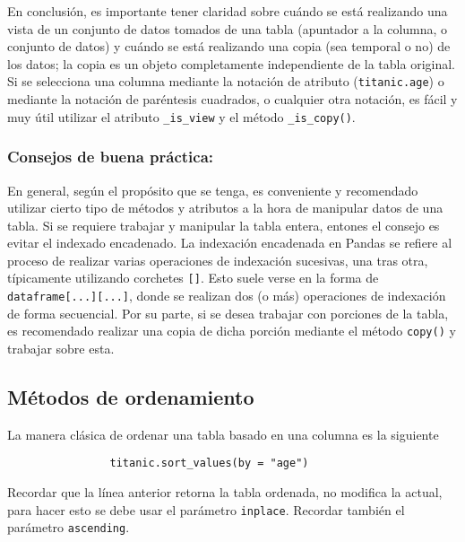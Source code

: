             \noindent En conclusión, es importante tener claridad sobre cuándo se está realizando una vista de un conjunto de datos tomados de una tabla (apuntador a la columna, o conjunto de datos) y cuándo se está realizando una copia (sea temporal o no) de los datos; la copia es un objeto completamente independiente de la tabla original. Si se selecciona una columna mediante la notación de atributo (\texttt{titanic.age}) o mediante la notación de paréntesis cuadrados, o cualquier otra notación, es fácil y muy útil utilizar el atributo \texttt{\_is\_view} y el método \texttt{\_is\_copy()}.

            \subsubsection{Consejos de buena práctica:} 
                En general, según el propósito que se tenga, es conveniente y recomendado utilizar cierto tipo de métodos y atributos a la hora de manipular datos de una tabla.
                Si se requiere trabajar y manipular la tabla entera, entones el consejo es evitar el indexado encadenado. La indexación encadenada en Pandas se refiere al proceso de realizar varias operaciones de indexación sucesivas, una tras otra, típicamente utilizando corchetes \texttt{[]}. Esto suele verse en la forma de \texttt{dataframe[...][...]}, donde se realizan dos (o más) operaciones de indexación de forma secuencial. Por su parte, si se desea trabajar con porciones de la tabla, es recomendado realizar una copia de dicha porción mediante el método \texttt{copy()} y trabajar sobre esta.

        \subsection{Métodos de ordenamiento}

            \noindent La manera clásica de ordenar una tabla basado en una columna es la siguiente
            \begin{verbatim}
                titanic.sort_values(by = "age")
            \end{verbatim}
            Recordar que la línea anterior retorna la tabla ordenada, no modifica la actual, para hacer esto se debe usar el parámetro \texttt{inplace}. Recordar también el parámetro \texttt{ascending}.

